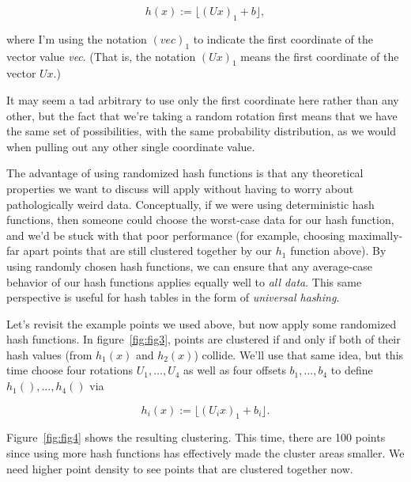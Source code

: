 \documentclass[20pt,]{extarticle}
\begin{document}
\[ h(x) := \lfloor (Ux)_1 + b \rfloor, \]

where I'm using the notation \(( \textit{vec} )_1\) to indicate the
first coordinate of the vector value \emph{vec}. (That is, the notation
\((Ux)_1\) means the first coordinate of the vector \(Ux\).)

It may seem a tad arbitrary to use only the first coordinate here rather
than any other, but the fact that we're taking a random rotation first
means that we have the same set of possibilities, with the same
probability distribution, as we would when pulling out any other single
coordinate value.

The advantage of using randomized hash functions is that any theoretical
properties we want to discuss will apply without having to worry about
pathologically weird data. Conceptually, if we were using deterministic
hash functions, then someone could choose the worst-case data for our
hash function, and we'd be stuck with that poor performance (for
example, choosing maximally-far apart points that are still clustered
together by our \(h_1\) function above). By using randomly chosen hash
functions, we can ensure that any average-case behavior of our hash
functions applies equally well to \emph{all data}. This same perspective
is useful for hash tables in the form of \emph{universal hashing}.

Let's revisit the example points we used above, but now apply some
randomized hash functions. In figure~\ref{fig:fig3}, points are
clustered if and only if both of their hash values (from \(h_1(x)\) and
\(h_2(x)\)) collide. We'll use that same idea, but this time choose four
rotations \(U_1, \ldots, U_4\) as well as four offsets
\(b_1, \ldots, b_4\) to define \(h_1(), \ldots, h_4()\) via

\begin{equation} h_i(x) := \lfloor (U_i x)_1 + b_i \rfloor. \label{eq:eq3}\end{equation}

Figure~\ref{fig:fig4} shows the resulting clustering. This time, there
are 100 points since using more hash functions has effectively made the
cluster areas smaller. We need higher point density to see points that
are clustered together now.
\end{document}
